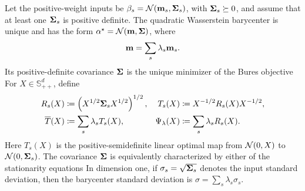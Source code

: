 \begin{prop}\label{prop-gaussian-barycenter}
	Let the positive-weight inputs be $\beta_s=\mathcal{N}(\mathbf{m}_s,\mathbf{\Sigma}_s)$, with $\mathbf{\Sigma}_s\succeq0$, and assume that at least one $\mathbf{\Sigma}_s$ is positive definite. The quadratic Wasserstein barycenter is unique and has the form $\alpha^\star=\mathcal{N}(\mathbf{m},\mathbf{\Sigma})$, where
	\[
		\mathbf{m}=\sum_s\lambda_s\mathbf{m}_s.
	\]
	Its positive-definite covariance $\mathbf{\Sigma}$ is the unique minimizer of the Bures objective
	For $X\in\mathbb S_{++}^d$, define
	\begin{align}
		R_s(X)
		&\coloneqq
		\left( X^{1/2}\mathbf{\Sigma}_sX^{1/2} \right)^{1/2},
		&
		T_s(X)
		&\coloneqq
		X^{-1/2}R_s(X)X^{-1/2},
		\label{eq-gaussian-barycenter-maps}
		\\
		\overline T(X)
		&\coloneqq
		\sum_s\lambda_sT_s(X),
		&
		\Psi_{\lambda}(X)
		&\coloneqq
		\sum_s\lambda_sR_s(X).
		\label{eq-gaussian-barycenter-average-map}
	\end{align}
	Here $T_s(X)$ is the positive-semidefinite linear optimal map from $\mathcal{N}(0,X)$ to $\mathcal{N}(0,\mathbf{\Sigma}_s)$. The covariance $\mathbf{\Sigma}$ is equivalently characterized by either of the stationarity equations
	In dimension one, if $\sigma_s=\sqrt{\mathbf{\Sigma}_s}$ denotes the input standard deviation, then the barycenter standard deviation is $\sigma=\sum_s\lambda_s\sigma_s$.
\end{prop}


